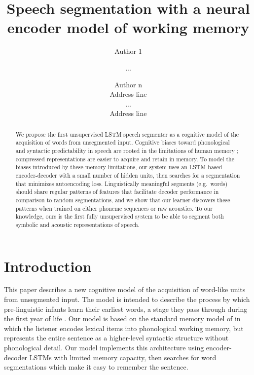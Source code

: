 \documentclass[11pt,letterpaper]{article}
\title{Speech segmentation with a neural encoder model of working memory}
\author{Author 1 \and ... \and Author n \\
        Address line \\ ... \\ Address line}
\date{}
\begin{document}
\maketitle

\begin{abstract}
We propose the first unsupervised LSTM speech segmenter as a cognitive model of the acquisition of words from unsegmented input.
Cognitive biases toward phonological and syntactic predictability in speech are rooted in the limitations of human memory \cite{Baddeley98};
compressed representations are easier to acquire and retain in memory.
To model the biases introduced by these memory limitations, our system uses an LSTM-based encoder-decoder with a small number of hidden units,
then searches for a segmentation that minimizes autoencoding loss.
Linguistically meaningful segments (e.g.\ words) should share regular patterns of features that facilitate decoder performance in comparison to random segmentations,
and we show that our learner discovers these patterns when trained on either phoneme sequences or raw acoustics.
To our knowledge, ours is the first fully unsupervised system to be able to segment both symbolic and acoustic representations of speech.
\end{abstract}


\section{Introduction}

This paper describes a new cognitive model of the acquisition of
word-like units from unsegmented input. The model is intended to
describe the process by which pre-linguistic infants learn their
earliest words, a stage they pass through during the first year of
life \cite{Jusczyk95,Bergelson12}. Our model is based on the standard
memory model of  in which the listener encodes
lexical items into phonological working memory, but represents the
entire sentence as a higher-level syntactic structure without
phonological detail. Our model implements this architecture using
encoder-decoder LSTMs with limited memory capacity, then searches for
word segmentations which make it easy to remember the sentence.
\end{document}
